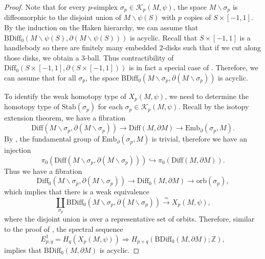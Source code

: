\documentclass[a4paper]{amsart}
\theoremstyle{definition}
\theoremstyle{remark}
\newcommand{\bZ}{\mathbb{Z}}
\newcommand\Diff{\mathrm{Diff}}
\newcommand\BDiff{\mathrm{BDiff}}
\numberwithin{equation}{section}
\begin{document}
\begin{proof}
Note that for every $p$-simplex $\sigma_p\in \mathcal{K}_{p}(M,\psi)$, the space $M\backslash \sigma_p$ is diffeomorphic to the disjoint union of $M\backslash \psi(S)$ with $p$ copies of $S\times [-1,1]$. By the induction on the Haken hierarchy, we can assume that $\BDiff_0(M\backslash \psi(S),\partial (M\backslash \psi(S)))$ is acyclic. Recall that $S\times [-1,1]$ is a handlebody  so there are finitely many embedded $2$-disks such that if we cut along those disks, we obtain a $3$-ball. Thus contractibility of  $\Diff_0(S\times [-1,1],\partial(S\times [-1,1]))$ is in fact a special case of . Therefore, we can assume that for all $\sigma_p$, the space $\BDiff_0(M\backslash \sigma_p,\partial(M\backslash \sigma_p))$ is acyclic. 

To identify the weak homotopy type of $X_p(M,\psi)$, we need to determine the homotopy type of $\text{Stab}(\sigma_p)$ for each $\sigma_p\in  \mathcal{K}_{p}(M,\psi)$. Recall by the isotopy extension theorem, we have a fibration
\[
\Diff(M\backslash \sigma_p,\partial (M\backslash \sigma_p))\to \Diff(M,\partial M)\to \text{Emb}_{\partial}(\sigma_p,M). 
\]
By \cite[Chapter 2, Section 7.2]{MR0356056}, the fundamental group of $ \text{Emb}_{\partial}(\sigma_p,M)$ is trivial, therefore we have an injection
\[
\pi_0(\Diff(M\backslash \sigma_p,\partial (M\backslash \sigma_p)))\hookrightarrow \pi_0( \Diff(M,\partial M)).
\]
Thus we have a fibration 
\[
\Diff_0(M\backslash \sigma_p,\partial (M\backslash \sigma_p))\to \Diff_0(M,\partial M)\to \text{orb}(\sigma_p),
\]
which implies that there is a weak equivalence  $$\coprod_{\sigma_p}\BDiff_0(M\backslash \sigma_p,\partial (M\backslash \sigma_p))\xrightarrow{\simeq}X_p(M, \psi),$$ where the disjoint union is over a representative set of orbits. Therefore, similar to the proof of , the spectral sequence
\[
E^1_{p,q}=H_q(X_p(M,\psi))\Rightarrow H_{p+q}(\BDiff_0(M,\partial M);\bZ),
\]
implies that $\BDiff_0(M,\partial M)$ is acyclic.
\end{proof}
\end{document}
